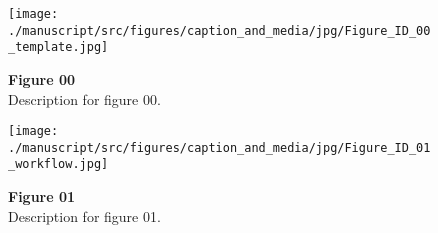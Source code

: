 
\begin{figure*}[p]
    \centering
    \texttt{[image: ./manuscript/src/figures/caption\_and\_media/jpg/Figure\_ID\_00\_template.jpg]}
    \caption{
\textbf{
Figure 00
}
\smallskip
\\
Description for figure 00.
}
    \label{fig:00_template}
\end{figure*}

\clearpage
\begin{figure*}[p]
    \centering
    \texttt{[image: ./manuscript/src/figures/caption\_and\_media/jpg/Figure\_ID\_01\_workflow.jpg]}
    \caption{
\textbf{
Figure 01
}
\smallskip
\\
Description for figure 01.
}
    \label{fig:01_workflow}
\end{figure*}

